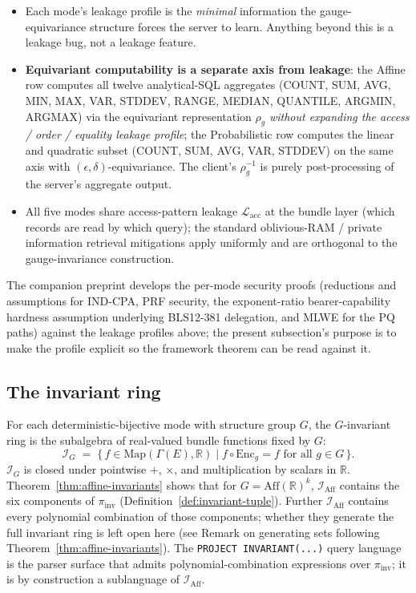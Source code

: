 \documentclass[11pt,letterpaper]{article}
\begin{document}
\begin{itemize}[nosep]
\item Each mode's leakage profile is the \emph{minimal} information
  the gauge-equivariance structure forces the server to learn.
  Anything beyond this is a leakage bug, not a leakage feature.
\item \textbf{Equivariant computability is a separate axis from
  leakage}: the Affine row computes all twelve analytical-SQL
  aggregates (COUNT, SUM, AVG, MIN, MAX, VAR, STDDEV, RANGE,
  MEDIAN, QUANTILE, ARGMIN, ARGMAX) via the equivariant
  representation
  $\rho_g$ \emph{without expanding the access / order / equality
  leakage profile}; the Probabilistic row computes the linear and
  quadratic subset (COUNT, SUM, AVG, VAR, STDDEV) on the same axis
  with $(\epsilon, \delta)$-equivariance. The client's
  $\rho_g^{-1}$ is purely post-processing of the server's aggregate
  output.
\item All five modes share access-pattern leakage
  $\mathcal{L}_{\mathrm{acc}}$ at the bundle layer (which records
  are read by which query); the standard
  oblivious-RAM / private information retrieval mitigations apply
  uniformly and are orthogonal to the gauge-invariance
  construction.
\end{itemize}

The companion preprint develops the per-mode security proofs
(reductions and assumptions for IND-CPA, PRF security, the
exponent-ratio bearer-capability hardness assumption underlying
BLS12-381 delegation, and MLWE for the PQ paths) against the
leakage
profiles above; the present subsection's purpose is to make the
profile explicit so the framework theorem can be read against it.

\subsection{The invariant ring}
\label{sec:gauge-invariance:ring}

For each deterministic-bijective mode with structure group $G$, the
$G$-invariant ring is the subalgebra of real-valued bundle functions
fixed by $G$:
\[
\mathcal{I}_G \;=\; \bigl\{\, f \in \mathrm{Map}(\Gamma(E), \mathbb{R})
                          \;\big|\; f \circ \mathrm{Enc}_g = f
                          \text{ for all } g \in G \,\bigr\}.
\]
$\mathcal{I}_G$ is closed under pointwise $+$, $\times$, and
multiplication by scalars in $\mathbb{R}$. Theorem~\ref{thm:affine-invariants}
shows that for $G = \mathrm{Aff}(\mathbb{R})^k$,
$\mathcal{I}_{\mathrm{Aff}}$ contains the six components of
$\pi_{\mathrm{inv}}$ (Definition~\ref{def:invariant-tuple}). Further
$\mathcal{I}_{\mathrm{Aff}}$ contains every polynomial combination of
those components; whether they generate the full invariant ring is
left open here (see Remark on generating sets following
Theorem~\ref{thm:affine-invariants}). The
\verb|PROJECT INVARIANT(...)| query language is the parser surface
that admits polynomial-combination expressions over $\pi_{\mathrm{inv}}$;
it is by construction a sublanguage of $\mathcal{I}_{\mathrm{Aff}}$.
\end{document}
